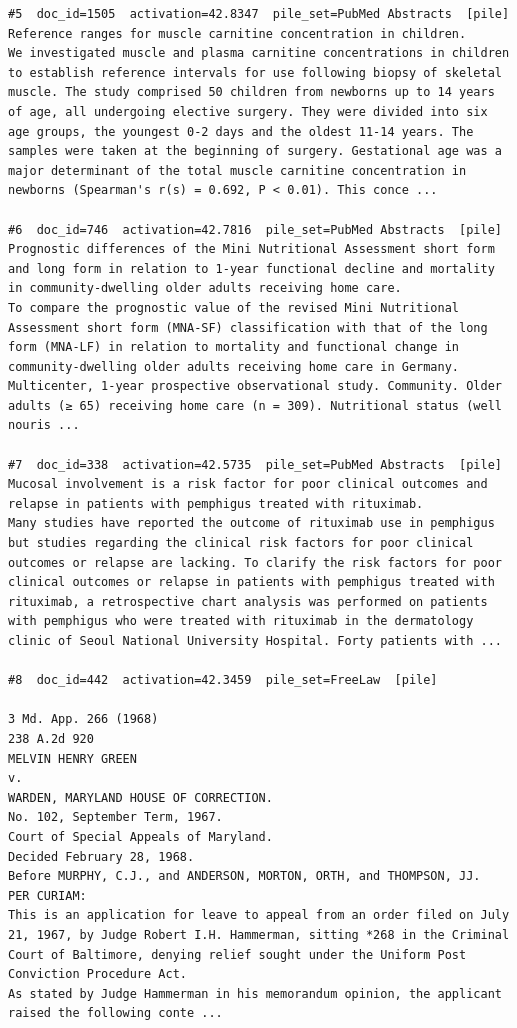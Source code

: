 \begin{verbatim}
#5  doc_id=1505  activation=42.8347  pile_set=PubMed Abstracts  [pile]
Reference ranges for muscle carnitine concentration in children.
We investigated muscle and plasma carnitine concentrations in children to establish reference intervals for use following biopsy of skeletal muscle. The study comprised 50 children from newborns up to 14 years of age, all undergoing elective surgery. They were divided into six age groups, the youngest 0-2 days and the oldest 11-14 years. The samples were taken at the beginning of surgery. Gestational age was a major determinant of the total muscle carnitine concentration in newborns (Spearman's r(s) = 0.692, P < 0.01). This conce ...

#6  doc_id=746  activation=42.7816  pile_set=PubMed Abstracts  [pile]
Prognostic differences of the Mini Nutritional Assessment short form and long form in relation to 1-year functional decline and mortality in community-dwelling older adults receiving home care.
To compare the prognostic value of the revised Mini Nutritional Assessment short form (MNA-SF) classification with that of the long form (MNA-LF) in relation to mortality and functional change in community-dwelling older adults receiving home care in Germany. Multicenter, 1-year prospective observational study. Community. Older adults (≥ 65) receiving home care (n = 309). Nutritional status (well nouris ...

#7  doc_id=338  activation=42.5735  pile_set=PubMed Abstracts  [pile]
Mucosal involvement is a risk factor for poor clinical outcomes and relapse in patients with pemphigus treated with rituximab.
Many studies have reported the outcome of rituximab use in pemphigus but studies regarding the clinical risk factors for poor clinical outcomes or relapse are lacking. To clarify the risk factors for poor clinical outcomes or relapse in patients with pemphigus treated with rituximab, a retrospective chart analysis was performed on patients with pemphigus who were treated with rituximab in the dermatology clinic of Seoul National University Hospital. Forty patients with ...

#8  doc_id=442  activation=42.3459  pile_set=FreeLaw  [pile]

3 Md. App. 266 (1968)
238 A.2d 920
MELVIN HENRY GREEN
v.
WARDEN, MARYLAND HOUSE OF CORRECTION.
No. 102, September Term, 1967.
Court of Special Appeals of Maryland.
Decided February 28, 1968.
Before MURPHY, C.J., and ANDERSON, MORTON, ORTH, and THOMPSON, JJ.
PER CURIAM:
This is an application for leave to appeal from an order filed on July 21, 1967, by Judge Robert I.H. Hammerman, sitting *268 in the Criminal Court of Baltimore, denying relief sought under the Uniform Post Conviction Procedure Act.
As stated by Judge Hammerman in his memorandum opinion, the applicant raised the following conte ...


\end{verbatim}
